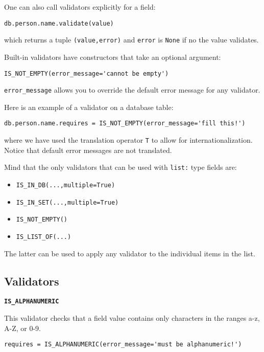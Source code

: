 \documentclass[justified,sixbynine,notoc]{tufte-book}
\def\ft{\small\tt}
\def\inxx#1{\index{#1}}
\begin{document}
\begin{fullwidth}
One can also call validators explicitly for a field:

\begin{lstlisting}
db.person.name.validate(value)
\end{lstlisting}
\noindent which returns a tuple {\ft (value,error)} and {\ft error} is {\ft None} if no the value validates.

Built-in validators have constructors that take an optional argument:

\begin{lstlisting}
IS_NOT_EMPTY(error_message='cannot be empty')
\end{lstlisting}

{\ft error\_message} allows you to override the default error message for any validator.

Here is an example of a validator on a database table:
\begin{lstlisting}
db.person.name.requires = IS_NOT_EMPTY(error_message='fill this!')
\end{lstlisting}
\noindent where we have used the translation operator {\ft T} to allow for internationalization. Notice that default error messages are not translated.

Mind that the only validators that can be used with {\ft list:} type fields are:

\begin{itemize}
\item {\ft IS\_IN\_DB(...,multiple=True)}

\item {\ft IS\_IN\_SET(...,multiple=True)}

\item {\ft IS\_NOT\_EMPTY()}

\item {\ft IS\_LIST\_OF(...)}
\end{itemize}

The latter can be used to apply any validator to the individual items in the list.

\goodbreak\subsection{Validators}

{\bf {\ft IS\_ALPHANUMERIC}}

\inxx{IS\_ALPHANUMERIC}

This validator checks that a field value contains only characters in the ranges a-z, A-Z, or 0-9.
\begin{lstlisting}
requires = IS_ALPHANUMERIC(error_message='must be alphanumeric!')
\end{lstlisting}


\end{fullwidth}
\end{document}
